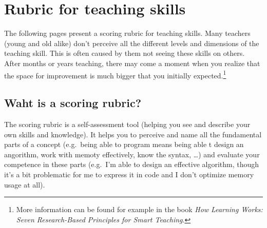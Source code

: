 
\newcommand{\rubriccriterion}[4]{
\stepcounter{rubricquestion}
\section*{\therubricquestion: #1}

\smallskip
\note{Unaware:} #2

\note{Beginner:} #3

\note{Guru:} #4

\medskip
\begin{tikzpicture}
\draw (0,0) -- (8,0);
\foreach \i in {0,1,...,8} %
{
\fill[black] (\i,0) circle (1.5 mm);
\fill[white] (\i,0) circle (1.4 mm);
}
\node at (0.15, -0.5) {unaware};
\node at (3, -0.5)    {beginner};
\node at (8, -0.5)    {guru};
\end{tikzpicture}
}

\restoregeometry
\chapter*{Rubric for teaching skills}
\label{rubric}

The following pages present a scoring rubric for teaching skills. Many teachers (young and old alike) don't perceive all the different levels and dimensions of the teaching skill. This is often caused by them not seeing these skills on others. After months or years teaching, there may come a moment when you realize that the space for improvement is much bigger that you initially expected.\footnote{More information can be found for example in the book \emph{How Learning Works: Seven Research-Based Principles for Smart Teaching}.}

\section*{Waht is a scoring rubric?}

The scoring rubric is a self-assessment tool (helping you see and describe your own skills and knowledge).
It helps you to perceive and name all the fundamental parts of a concept (e.g.\ being able to program means being able t design an angorithm, work with memoty effectively, know the syntax, \dots) and evaluate your competence in these parts (e.g.\ I'm able to design an effective algorithm, though it's a bit problematic for me to express it in code and I don't optimize memory usage at all).

